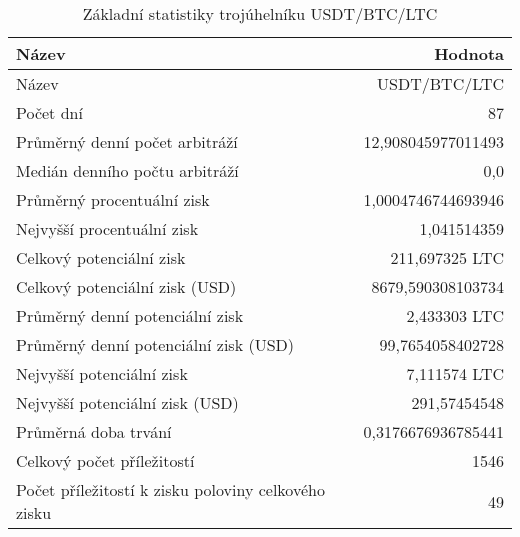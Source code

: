 \begin{table}\centering
\caption{Základní statistiky trojúhelníku USDT/BTC/LTC}
\label{USDTBTCLTC_stats}
\begin{tabular}{|| l | r ||}
\hline Název & Hodnota \\ 
\hline\hline Název & USDT/BTC/LTC \\ 
\hline Počet dní & 87 \\ 
\hline Průměrný denní počet arbitráží & 12,908045977011493 \\ 
\hline Medián denního počtu arbitráží & 0,0 \\ 
\hline Průměrný procentuální zisk & 1,0004746744693946 \\ 
\hline Nejvyšší procentuální zisk & 1,041514359 \\ 
\hline Celkový potenciální zisk & 211,697325 LTC \\ 
\hline Celkový potenciální zisk (USD) & 8679,590308103734 \\ 
\hline Průměrný denní potenciální zisk & 2,433303 LTC \\ 
\hline Průměrný denní potenciální zisk (USD) & 99,7654058402728 \\ 
\hline Nejvyšší potenciální zisk & 7,111574 LTC \\ 
\hline Nejvyšší potenciální zisk (USD) & 291,57454548 \\ 
\hline Průměrná doba trvání & 0,3176676936785441 \\ 
\hline Celkový počet příležitostí & 1546 \\ 
\hline Počet příležitostí k zisku poloviny celkového zisku & 49 \\ 
\hline
\end{tabular}
\end{table}